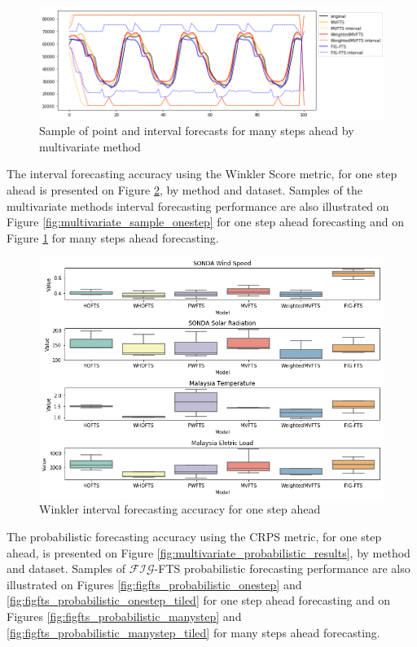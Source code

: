 \begin{figure}[htb]
    \centering
    \includegraphics[width=\textwidth]{figures/multivariate_sample_manystep.png}
    \caption{Sample of point and interval forecasts for many steps ahead by multivariate method}
    \label{fig:multivariate_sample_manystep}
\end{figure}

The interval forecasting accuracy using the Winkler Score metric, for one step ahead is presented on Figure \ref{fig:multivariate_interval_results}, by method and dataset. Samples of the multivariate methods interval forecasting performance are also illustrated on Figure \ref{fig:multivariate_sample_onestep} for one step ahead forecasting and on Figure \ref{fig:multivariate_sample_manystep} for many steps ahead forecasting.

\begin{figure}[htb]
    \centering
    \includegraphics[width=\textwidth]{figures/multivariate_point_results.png}
    \caption{Winkler interval forecasting accuracy for one step ahead}
    \label{fig:multivariate_interval_results}
\end{figure}

The probabilistic forecasting accuracy using the CRPS metric, for one step ahead, is presented on Figure \ref{fig:multivariate_probabilistic_results}, by method and dataset. Samples of $\mathcal{FIG}$-FTS probabilistic forecasting performance are also illustrated on Figures \ref{fig:figfts_probabilistic_onestep} and \ref{fig:figfts_probabilistic_onestep_tiled} for one step ahead forecasting and on Figures \ref{fig:figfts_probabilistic_manystep} and \ref{fig:figfts_probabilistic_manystep_tiled} for many steps ahead forecasting.

